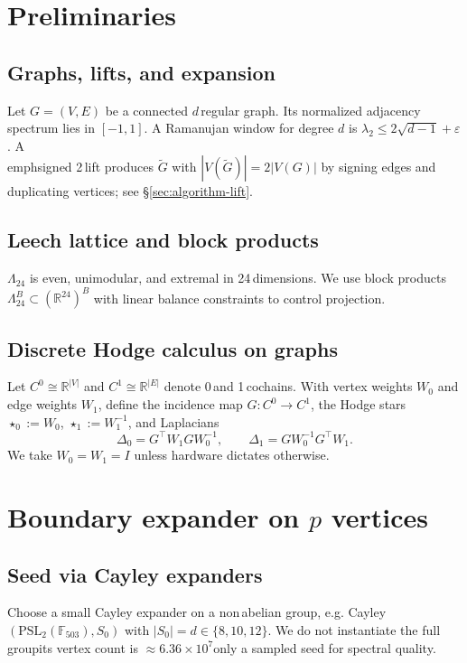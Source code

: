 \documentclass[11pt]{article}
\theoremstyle{definition}
\newcommand{\PSL}{\mathrm{PSL}}
\newcommand{\R}{\mathbb R}
\newcommand{\F}{\mathbb F}
\newcommand{\PSL}{\mathrm{PSL}}
\newcommand{\LLeech}{\Lambda_{24}}
\begin{document}
\section{Preliminaries}
\subsection{Graphs, lifts, and expansion}
Let \(G=(V,E)\) be a connected \(d\)\,regular graph. Its normalized adjacency spectrum lies in \([-1,1]\). A Ramanujan window for degree \(d\) is \(\lambda_2\le 2\sqrt{d-1}+\varepsilon\). A \\emph{signed 2\,lift} produces \(\tilde G\) with \(|V(\tilde G)|=2|V(G)|\) by signing edges and duplicating vertices; see \S\ref{sec:algorithm-lift}.

\subsection{Leech lattice and block products}
\(\LLeech\) is even, unimodular, and extremal in 24\,dimensions. We use block products \(\LLeech^{B}\subset (\R^{24})^{B}\) with linear balance constraints to control projection.

\subsection{Discrete Hodge calculus on graphs}
Let \(C^0\cong\R^{|V|}\) and \(C^1\cong\R^{|E|}\) denote 0\,and 1\,cochains. With vertex weights \(W_0\) and edge weights \(W_1\), define the incidence map \(G:C^0\to C^1\), the Hodge stars \(\star_0:=W_0\), \(\star_1:=W_1^{-1}\), and Laplacians
\begin{equation}
\Delta_0=G^{\top}W_1GW_0^{-1},\qquad \Delta_1=GW_0^{-1}G^{\top}W_1.
\end{equation}
We take \(W_0=W_1=I\) unless hardware dictates otherwise.

\section{Boundary expander on $p$ vertices}
\label{sec:boundary}
\subsection{Seed via Cayley expanders}
Choose a small Cayley expander on a non\,abelian group, e.g. Cayley\((\PSL_2(\F_{503}),S_0)\) with \(|S_0|=d\in\{8,10,12\}\). We do not instantiate the full group\textemdash its vertex count is \(\approx 6.36\times 10^7\)\textemdash only a sampled seed for spectral quality.
\end{document}
